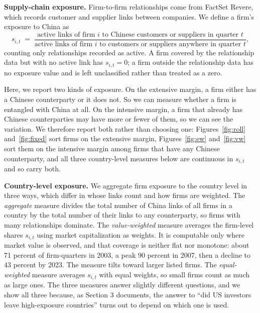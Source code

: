 \documentclass[11pt]{article}
\begin{document}
\textbf{Supply-chain exposure.} Firm-to-firm relationships come from FactSet
Revere, which records customer and supplier links between companies. We
define a firm's exposure to China as
\begin{equation*}
s_{i,t} \;=\;
\frac{\text{active links of firm } i \text{ to Chinese customers or suppliers in quarter } t}
     {\text{active links of firm } i \text{ to customers or suppliers anywhere in quarter } t},
\end{equation*}
counting only relationships recorded as active. A firm covered by the
relationship data but with no active link has $s_{i,t}=0$; a firm outside the
relationship data has no exposure value and is left unclassified rather than
treated as a zero.

Here, we report two kinds of exposure.  On the extensive margin, a firm either has a Chinese counterparty or it does
not. So we can measure whether a firm is entangled with China at
all.  On the intensive margin, a firm that already has Chinese
counterparties may have more or fewer of them, so we can see the variation.  We therefore report both rather than choosing one:
Figures~\ref{fig:roll} and~\ref{fig:fixed} sort firms on the extensive margin,
Figures~\ref{fig:ew} and~\ref{fig:vw} sort them on the intensive margin among
firms that have any Chinese counterparty, and all three country-level measures
below are continuous in $s_{i,t}$ and so carry both.

\textbf{Country-level exposure.} We aggregate firm exposure to the country
level in three ways, which differ in whose links count and how firms are
weighted. The \emph{aggregate} measure divides the total number of China
links of all firms in a country by the total number of their links to any
counterparty, so firms with many relationships dominate. The
\emph{value-weighted} measure averages the firm-level shares $s_{i,t}$ using
market capitalization as weights. It is computable only where market value is
observed, and that coverage is neither flat nor monotone: about 71 percent of
firm-quarters in 2003, a peak 90 percent in 2007, then a decline to 43
percent by 2023. The measure tilts toward larger listed firms. The
\emph{equal-weighted} measure averages $s_{i,t}$ with equal weights, so small firms count as much as large ones. The three measures answer slightly different questions, and we show all three because, as
Section 3 documents, the answer to ``did US investors leave high-exposure
countries'' turns out to depend on which one is used.
\end{document}
